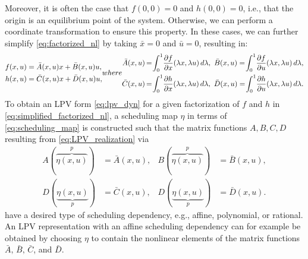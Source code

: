 Moreover, it is often the case that $f(0, 0) = 0$ and {$h(0, 0) = 0$}, i.e., that the origin is an equilibrium point of the system. Otherwise, we can perform a coordinate transformation to ensure this property. In these cases, we can further simplify \eqref{eq:factorized_nl} by taking $\bar{x} = 0$ and $\bar{u} = 0$, resulting in:
%
\begin{subequations}
	\label{eq:simplified_factorized_nl}
	\begin{align}
		f(x, u) & = \bar{A}(x, u) x + \bar{B}(x, u) u, \\
		h(x, u) & = \bar{C}(x, u) x + \bar{D}(x, u) u,
	\end{align}
	where
	\begin{align*}
		\bar{A}(x, u) \hspace{-1pt} & = \hspace{-2pt} \int_{0}^{1} \! \frac{\partial f}{\partial x}(\lambda x, \lambda u) \, d \lambda, \
		\bar{B}(x, u)  = \hspace{-2pt} \int_{0}^{1} \! \frac{\partial f}{\partial u}(\lambda x, \lambda u) \, d \lambda,                  \\
		\bar{C}(x, u) \hspace{-1pt} & = \hspace{-2pt} \int_{0}^{1} \! \frac{\partial h}{\partial x}(\lambda x, \lambda u) \, d \lambda, \
		\bar{D}(x, u)  = \hspace{-2pt} \int_{0}^{1} \! \frac{\partial h}{\partial u}(\lambda x, \lambda u) \, d \lambda.
	\end{align*}
\end{subequations}
%
To obtain an LPV form \eqref{eq:lpv_dyn} for a given factorization of $f$ and $h$ in \eqref{eq:simplified_factorized_nl}, a 
scheduling map $\eta$ in terms of \eqref{eq:scheduling_map} is constructed  
%
such that the matrix functions $A,B,C,D$ resulting from \eqref{eq:LPV_realization} via 
\begin{equation}
	\begin{aligned}
		\label{eq:lpv_matrices}
		A(\overbrace{\eta(x,u)}^{p}) & = \bar{A}(x, u), & B(\overbrace{\eta(x,u)}^{p}) & = \bar{B}(x, u), \\
		D(\underbrace{\eta(x,u)}_p) & = \bar{C}(x, u), & D(\underbrace{\eta(x,u)}_p) & = \bar{D}(x, u).
	\end{aligned}
\end{equation}
have a  
%
desired type of scheduling dependency, e.g., affine, polynomial, or rational. An LPV representation with an affine scheduling dependency can for example be obtained by choosing $\eta$ to contain the nonlinear elements of the matrix functions $\bar{A},\, \bar{B},\, \bar{C}$, and $\bar{D}$. 

